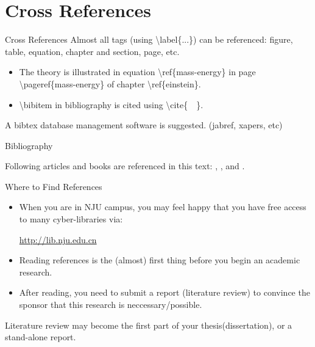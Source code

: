 \documentclass[10pt]{beamer}
\begin{document}
\section{Cross References}
\begin{frame}[t]{Cross References}
    Almost all tags (using \textbackslash label\{...\})
    can be referenced: figure, table, equation,
    chapter and section, page, etc.
\begin{itemize}
    \item The theory is illustrated in equation
        \alert{\textbackslash ref\{mass-energy\}} in page
        \alert{\textbackslash pageref\{mass-energy\}} of chapter
        \alert{\textbackslash ref\{einstein\}}.

    \item \textbackslash bibitem in bibliography is cited using
        \textbackslash cite\{\ \ \}.
\end{itemize}
A bibtex database management software is suggested.
(jabref, xapers, etc)
\end{frame}

\begin{frame}{Bibliography}

 Following articles and books are referenced in this text:
    \cite{Knuth_texbook}, \cite{texmanual}, \cite{David_tex_land} and
    \cite{website:top500}.


    
    
\end{frame}

\begin{frame}[t]{Where to Find References}
\begin{itemize}
    \item When you are in NJU campus, you may feel happy that you have
    free access to many cyber-libraries via:

    \url{http://lib.nju.edu.cn} \\[2ex]
    \item Reading references is the (almost) first thing before
        you begin an academic research.
    \item After reading, you need to submit a report (literature review)
        to convince the sponsor that this research is neccessary/possible.
\end{itemize}
Literature review may become the first part of your thesis(dissertation),
or a stand-alone report.
\end{frame}
\end{document}
